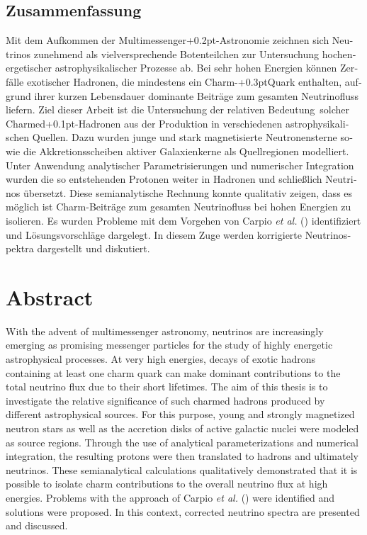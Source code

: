 \begin{otherlanguage}{ngerman}
	\chapter*{Zusammenfassung}

	Mit dem Aufkommen der Multimessenger{\kern+0.2pt}-Astronomie zeichnen sich Neutrinos zunehmend als vielversprechende
	Botenteilchen zur Untersuchung hochenergetischer astrophysikalischer Prozesse ab. Bei sehr hohen Energien können Zerfälle
	exotischer Hadronen, die mindestens ein Charm-{\kern+0.3pt}Quark enthalten, aufgrund ihrer kurzen Lebensdauer dominante
	Beiträge zum gesamten Neutrinofluss liefern. Ziel dieser Arbeit ist die Untersuchung der relativen Bedeutung~solcher
	Charmed{\kern+0.1pt}-Hadronen aus der Produktion in verschiedenen astrophysikalischen Quellen. Dazu wurden junge und
	stark magnetisierte Neutronensterne sowie die Akkretionsscheiben \mbox{aktiver} Galaxienkerne als Quellregionen modelliert.
	Unter Anwendung analytischer Parametrisierungen und numerischer Integration wurden die so entstehenden Protonen
	weiter in Hadronen und schließlich Neutrinos übersetzt. Diese semianalytische Rechnung konnte qualitativ
	zeigen, dass es möglich ist Charm-Beiträge zum gesamten Neutrinofluss bei hohen Energien zu isolieren. Es wurden
	Probleme mit dem Vorgehen von Carpio \emph{et al.} () identifiziert und Lösungsvorschläge
	dargelegt. In diesem Zuge werden korrigierte Neutrinospektra dargestellt und diskutiert.

\end{otherlanguage}



{\let\clearpage\relax\chapter*{Abstract}\label{ch:abstract}}

With the advent of multimessenger astronomy, neutrinos are increasingly emerging as promising messenger particles for the
study of highly energetic astrophysical processes. At very high energies, decays of exotic hadrons containing at least one
charm quark can make dominant contributions to the total neutrino flux due to their short lifetimes. The aim of this
thesis is to investigate the relative significance of such charmed hadrons produced by different astrophysical sources.
For this purpose, young and strongly magnetized neutron stars as well as the accretion disks of active galactic nuclei were
modeled as source regions. Through the use of analytical parameterizations and numerical integration, the resulting protons
were then translated to hadrons and ultimately neutrinos. These semianalytical calculations qualitatively
demonstrated that it is possible to isolate charm contributions to the overall neutrino flux at high energies. Problems
with the approach of Carpio \emph{et al.} () were identified and solutions were proposed.
In this context, corrected neutrino spectra are presented and discussed.
